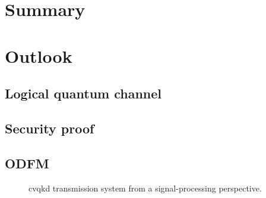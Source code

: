 \section{Summary}

\section{Outlook}

\subsection{Logical quantum channel}

\subsection{Security proof}

\subsection{ODFM}

\begin{figure}[htb]
	\centering
	
	\caption{\Gls{cvqkd} transmission system from a signal-processing perspective.}
\end{figure}
